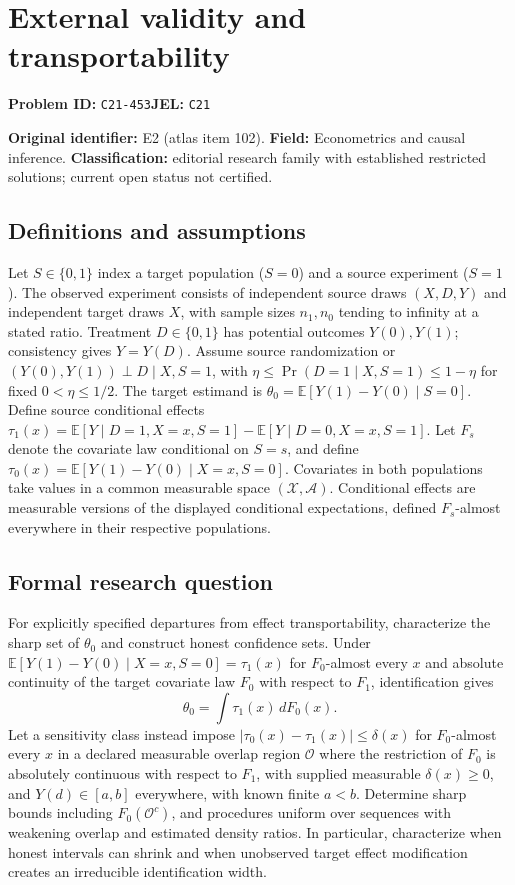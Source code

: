 \documentclass[11pt,a4paper]{article}
\begin{document}
\section*{External validity and transportability}
\textbf{Problem ID:} \texttt{C21-453}\quad \textbf{JEL:} \texttt{C21}\par
\label{problem:OP-0102}
\label{atlas:prob:E2}

\noindent\textbf{Original identifier:} E2 (atlas item 102). \textbf{Field:} Econometrics and causal inference. \textbf{Classification:} editorial research family with established restricted solutions; current open status not certified.

\subsection*{Definitions and assumptions}

Let $S\in\{0,1\}$ index a target population ($S=0$) and a source experiment ($S=1$). The observed experiment consists of independent source draws $(X,D,Y)$ and independent target draws $X$, with sample sizes $n_1,n_0$ tending to infinity at a stated ratio. Treatment $D\in\{0,1\}$ has potential outcomes $Y(0),Y(1)$; consistency gives $Y=Y(D)$. Assume source randomization or $(Y(0),Y(1))\perp D\mid X,S=1$, with $\eta\le\Pr(D=1\mid X,S=1)\le1-\eta$ for fixed $0<\eta\le1/2$. The target estimand is $\theta_0=\mathbb E[Y(1)-Y(0)\mid S=0]$. Define source conditional effects $\tau_1(x)=\mathbb E[Y\mid D=1,X=x,S=1]-\mathbb E[Y\mid D=0,X=x,S=1]$. Let $F_s$ denote the covariate law conditional on $S=s$, and define $\tau_0(x)=\mathbb E[Y(1)-Y(0)\mid X=x,S=0]$. Covariates in both populations take values in a common measurable space $(\mathcal X,\mathcal A)$. Conditional effects are measurable versions of the displayed conditional expectations, defined $F_s$-almost everywhere in their respective populations.

\subsection*{Formal research question}

For explicitly specified departures from effect transportability, characterize the sharp set of $\theta_0$ and construct honest confidence sets. Under $\mathbb E[Y(1)-Y(0)\mid X=x,S=0]=\tau_1(x)$ for $F_0$-almost every $x$ and absolute continuity of the target covariate law $F_0$ with respect to $F_1$, identification gives
\[
\theta_0=\int\tau_1(x)\,dF_0(x).
\]
Let a sensitivity class instead impose $|\tau_0(x)-\tau_1(x)|\le\delta(x)$ for $F_0$-almost every $x$ in a declared measurable overlap region $\mathcal O$ where the restriction of $F_0$ is absolutely continuous with respect to $F_1$, with supplied measurable $\delta(x)\ge0$, and $Y(d)\in[a,b]$ everywhere, with known finite $a<b$. Determine sharp bounds including $F_0(\mathcal O^c)$, and procedures uniform over sequences with weakening overlap and estimated density ratios. In particular, characterize when honest intervals can shrink and when unobserved target effect modification creates an irreducible identification width.
\end{document}
